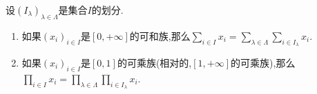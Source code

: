\begin{proposition}{}{}
	设$\left(I_{\lambda}\right)_{\lambda\in\Lambda}$是集合$I$的划分.
	\begin{enumerate}
		\item 如果$\left(x_{i}\right)_{i\in I}$是$\left[0,+\infty\right]$的可和族,那么$\sum\limits_{i\in I}x_{i}=\sum\limits_{\lambda\in\Lambda}\sum\limits_{i\in I_{\lambda}}x_{i}$.
		\item 如果$\left(x_{i}\right)_{i\in I}$是$\left[0,1\right]$的可乘族(相对的,$\left[1,+\infty\right]$的可乘族),那么$\prod\limits_{i\in I}x_{i}=\prod\limits_{\lambda\in\Lambda}\prod\limits_{i\in I_{\lambda}}x_{i}$.
	\end{enumerate}
\end{proposition}